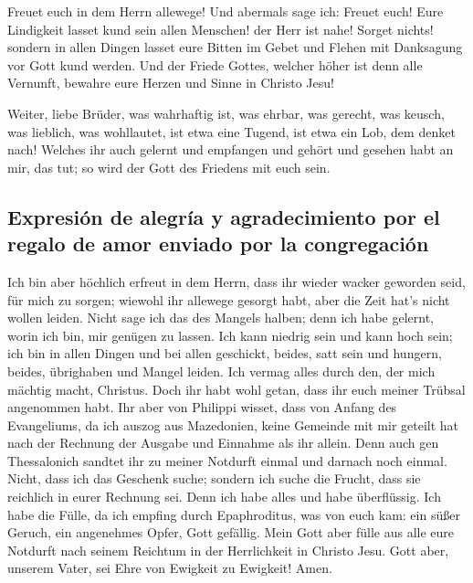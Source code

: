  Freuet euch in dem Herrn allewege! Und abermals sage ich:
Freuet euch!  Eure Lindigkeit lasset kund sein allen
Menschen! der Herr ist nahe!  Sorget nichts! sondern in
allen Dingen lasset eure Bitten im Gebet und Flehen mit Danksagung vor
Gott kund werden.  Und der Friede Gottes, welcher höher
ist denn alle Vernunft, bewahre eure Herzen und Sinne in Christo Jesu!

 Weiter, liebe Brüder, was wahrhaftig ist, was ehrbar, was
gerecht, was keusch, was lieblich, was wohllautet, ist etwa eine Tugend,
ist etwa ein Lob, dem denket nach!  Welches ihr auch
gelernt und empfangen und gehört und gesehen habt an mir, das tut; so
wird der Gott des Friedens mit euch sein.

\hypertarget{expresiuxf3n-de-alegruxeda-y-agradecimiento-por-el-regalo-de-amor-enviado-por-la-congregaciuxf3n}{%
\subsection{Expresión de alegría y agradecimiento por el regalo de amor
enviado por la
congregación}\label{expresiuxf3n-de-alegruxeda-y-agradecimiento-por-el-regalo-de-amor-enviado-por-la-congregaciuxf3n}}

 Ich bin aber höchlich erfreut in dem Herrn, dass ihr
wieder wacker geworden seid, für mich zu sorgen; wiewohl ihr allewege
gesorgt habt, aber die Zeit hat's nicht wollen leiden. 
Nicht sage ich das des Mangels halben; denn ich habe gelernt, worin ich
bin, mir genügen zu lassen.  Ich kann niedrig sein und
kann hoch sein; ich bin in allen Dingen und bei allen geschickt, beides,
satt sein und hungern, beides, übrighaben und Mangel leiden.
 Ich vermag alles durch den, der mich mächtig macht,
Christus.  Doch ihr habt wohl getan, dass ihr euch meiner
Trübsal angenommen habt.  Ihr aber von Philippi wisset,
dass von Anfang des Evangeliums, da ich auszog aus Mazedonien, keine
Gemeinde mit mir geteilt hat nach der Rechnung der Ausgabe und Einnahme
als ihr allein.  Denn auch gen Thessalonich sandtet ihr
zu meiner Notdurft einmal und darnach noch einmal. 
Nicht, dass ich das Geschenk suche; sondern ich suche die Frucht, dass
sie reichlich in eurer Rechnung sei.  Denn ich habe alles
und habe überflüssig. Ich habe die Fülle, da ich empfing durch
Epaphroditus, was von euch kam: ein süßer Geruch, ein angenehmes Opfer,
Gott gefällig.  Mein Gott aber fülle aus alle eure
Notdurft nach seinem Reichtum in der Herrlichkeit in Christo Jesu.
 Gott aber, unserem Vater, sei Ehre von Ewigkeit zu
Ewigkeit! Amen.


